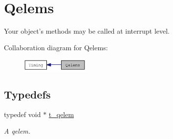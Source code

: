 \hypertarget{group__qelems}{
\section{Qelems}
\label{group__qelems}
}


Your object’s methods may be called at interrupt level.  


Collaboration diagram for Qelems:\nopagebreak
\begin{figure}[H]
\begin{center}
\leavevmode
\includegraphics[width=96pt]{group__qelems}
\end{center}
\end{figure}
\subsection*{Typedefs}
\begin{DoxyCompactItemize}
\item 
\hypertarget{group__qelems_ga4d219449d88d2b9648a992152b278090}{
typedef void $\ast$ \hyperlink{group__qelems_ga4d219449d88d2b9648a992152b278090}{t\_\-qelem}}
\label{group__qelems_ga4d219449d88d2b9648a992152b278090}

\begin{DoxyCompactList}\small\item\em A qelem. \item\end{DoxyCompactList}\end{DoxyCompactItemize}
